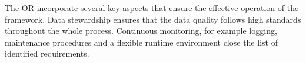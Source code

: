 The OR incorporate several key aspects that ensure the effective operation of the framework. Data stewardship ensures that the data quality follows high standards throughout the whole process. Continuous monitoring, for example logging, maintenance procedures and a flexible runtime environment close the list of identified requirements.

